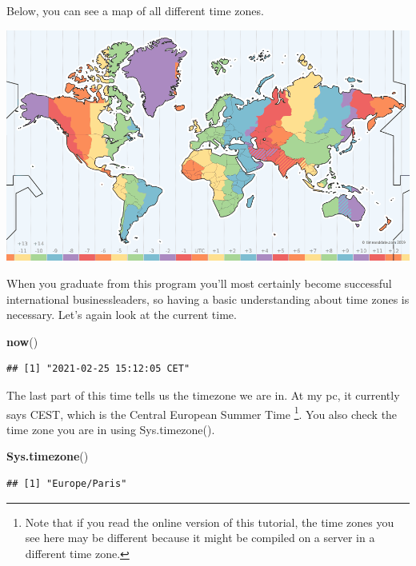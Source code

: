 \documentclass[]{tufte-book}
\newenvironment{Shaded}{}{}
\newcommand{\KeywordTok}[1]{\textcolor[rgb]{0.00,0.44,0.13}{\textbf{#1}}}
\newcommand{\NormalTok}[1]{#1}
\begin{document}
Below, you can see a map of all different time zones.

\begin{center}\includegraphics[width=1\linewidth]{images/timezones} \end{center}

When you graduate from this program you'll most certainly become successful international businessleaders, so having a basic understanding about time zones is necessary. Let's again look at the current time.

\begin{Shaded}
\begin{Highlighting}[]
\KeywordTok{now}\NormalTok{()}
\end{Highlighting}
\end{Shaded}

\begin{verbatim}
## [1] "2021-02-25 15:12:05 CET"
\end{verbatim}

The last part of this time tells us the timezone we are in. At my pc, it currently says CEST, which is the Central European Summer Time \footnote{Note that if you read the online version of this tutorial, the time zones you see here may be different because it might be compiled on a server in a different time zone.}. You also check the time zone you are in using Sys.timezone().

\begin{Shaded}
\begin{Highlighting}[]
\KeywordTok{Sys.timezone}\NormalTok{()}
\end{Highlighting}
\end{Shaded}

\begin{verbatim}
## [1] "Europe/Paris"
\end{verbatim}
\end{document}
